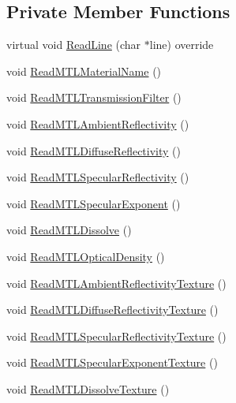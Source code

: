 \subsection*{Private Member Functions}
\begin{DoxyCompactItemize}
\item 
virtual void \hyperlink{classmage_1_1_m_t_l_reader_ac3981549364be195f96b32cfafc8b147}{Read\+Line} (char $\ast$line) override
\item 
void \hyperlink{classmage_1_1_m_t_l_reader_a53494ca5e0f905b97227b21711a1686a}{Read\+M\+T\+L\+Material\+Name} ()
\item 
void \hyperlink{classmage_1_1_m_t_l_reader_a4d5819606b5ea81862852587b2e1511b}{Read\+M\+T\+L\+Transmission\+Filter} ()
\item 
void \hyperlink{classmage_1_1_m_t_l_reader_a7137e998979a79fe258f226bfbda669e}{Read\+M\+T\+L\+Ambient\+Reflectivity} ()
\item 
void \hyperlink{classmage_1_1_m_t_l_reader_accd087a8e5b2d489b83f70ecf0fe0d18}{Read\+M\+T\+L\+Diffuse\+Reflectivity} ()
\item 
void \hyperlink{classmage_1_1_m_t_l_reader_aa90f43e397bc5fc277b936bdeff4e672}{Read\+M\+T\+L\+Specular\+Reflectivity} ()
\item 
void \hyperlink{classmage_1_1_m_t_l_reader_a0ac9c6202ff7fa921d551e1aaa59b33f}{Read\+M\+T\+L\+Specular\+Exponent} ()
\item 
void \hyperlink{classmage_1_1_m_t_l_reader_a788a80ec60a2e50c1017630afb607f1c}{Read\+M\+T\+L\+Dissolve} ()
\item 
void \hyperlink{classmage_1_1_m_t_l_reader_a06576927d764c9cd2be41871f137fac4}{Read\+M\+T\+L\+Optical\+Density} ()
\item 
void \hyperlink{classmage_1_1_m_t_l_reader_ae5fa12979b84a5880bf560b43d495305}{Read\+M\+T\+L\+Ambient\+Reflectivity\+Texture} ()
\item 
void \hyperlink{classmage_1_1_m_t_l_reader_ad941332bf48f9fd9f7c4cecf5ae6ccc4}{Read\+M\+T\+L\+Diffuse\+Reflectivity\+Texture} ()
\item 
void \hyperlink{classmage_1_1_m_t_l_reader_abb56329a3642b377b006bca6cee60440}{Read\+M\+T\+L\+Specular\+Reflectivity\+Texture} ()
\item 
void \hyperlink{classmage_1_1_m_t_l_reader_a9b68187f940dc05a5d86527843f09d18}{Read\+M\+T\+L\+Specular\+Exponent\+Texture} ()
\item 
void \hyperlink{classmage_1_1_m_t_l_reader_aae7a327ad0c5223041c9e849ea2a88d7}{Read\+M\+T\+L\+Dissolve\+Texture} ()
\item 

\end{DoxyCompactItemize}
